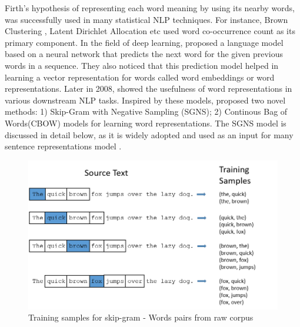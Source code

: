 \documentclass[12pt]{report} %
\begin{document}
Firth's hypothesis of representing each word meaning by using its nearby words, was successfully used in many statistical NLP techniques. For instance, Brown Clustering \citep{brown1992practical} , Latent Dirichlet Allocation \citep{blei2003latent} etc used word co-occurrence count as its primary component. In the field of deep learning, \cite{bengio2003neural} proposed a language model based on a neural network that predicts the next word for the given previous words in a sequence. They also noticed that this prediction model helped in learning a vector representation for words called word embeddings or word representations.
Later in 2008, \cite{collobert2008unified} showed the usefulness of word representations in various downstream NLP tasks.
Inspired by these models, \cite{mikolov2014word2vec} proposed two novel methods: 1) Skip-Gram with Negative Sampling (SGNS); 2) Continous Bag of Words(CBOW) models for learning word representations. The SGNS model is discussed in detail below, as it is widely adopted and used as an input for many sentence representations model \citep{kiros2015skip}.

\begin{figure}[!tbp]
	\centering
	\includegraphics[scale=0.70]{image/train_samples.png}
	\caption{Training samples for skip-gram - Words pairs from raw corpus}
	\label{train_sam}
\end{figure}
\end{document}
